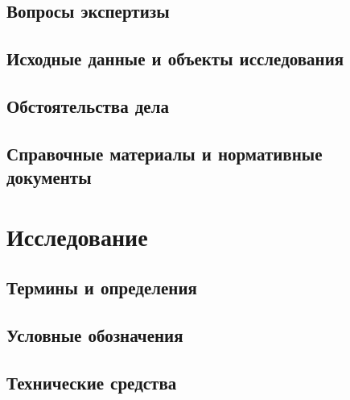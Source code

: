 



\thispagestyle{empty}  %









\subsection{Вопросы экспертизы}


\subsection{Исходные данные и объекты исследования}


\subsection{Обстоятельства дела}


\printbibliography 

\subsection{Справочные материалы и нормативные документы}
%


\section{Исследование}

\subsection{Термины и определения}


\subsection{Условные обозначения}


\subsection{Технические средства}


